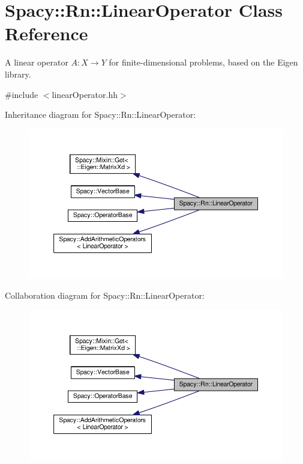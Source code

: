 \hypertarget{classSpacy_1_1Rn_1_1LinearOperator}{}\section{Spacy\+:\+:Rn\+:\+:Linear\+Operator Class Reference}
\label{classSpacy_1_1Rn_1_1LinearOperator}


A linear operator $A:X\rightarrow Y$ for finite-\/dimensional problems, based on the Eigen library.  




{\ttfamily \#include $<$linear\+Operator.\+hh$>$}



Inheritance diagram for Spacy\+:\+:Rn\+:\+:Linear\+Operator\+:\nopagebreak
\begin{figure}[H]
\begin{center}
\leavevmode
\includegraphics[width=350pt]{classSpacy_1_1Rn_1_1LinearOperator__inherit__graph}
\end{center}
\end{figure}


Collaboration diagram for Spacy\+:\+:Rn\+:\+:Linear\+Operator\+:\nopagebreak
\begin{figure}[H]
\begin{center}
\leavevmode
\includegraphics[width=350pt]{classSpacy_1_1Rn_1_1LinearOperator__coll__graph}
\end{center}
\end{figure}
